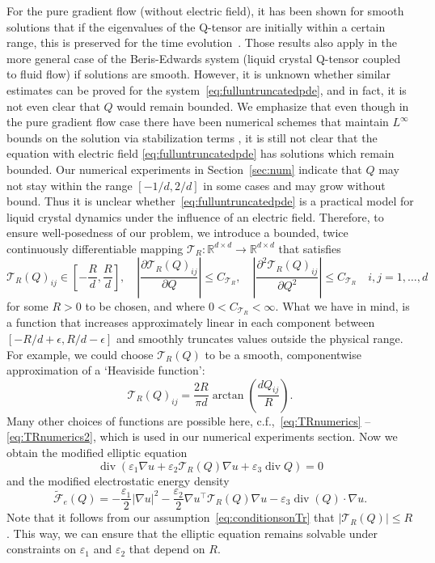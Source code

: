 \documentclass[10pt,letterpaper]{amsart}
\newcommand{\R}{\mathbb{R}}
\newcommand{\CTR}{C_{\mathcal{T}_R}}
\newcommand{\T}{\mathcal T}
\theoremstyle{definition}{\newtheorem{definition}[lemma]{Definition}}
\theoremstyle{note}{\newtheorem{claim}{Claim}[section]
\newtheorem*{claim*}{Claim}}
\numberwithin{equation}{section}
\begin{document}
For the pure gradient flow (without electric field), it has been shown for smooth solutions that if the eigenvalues of the Q-tensor are initially within a certain range, this is preserved for the time evolution~\cite{Wu2019,Contreras2019}. Those results also apply in the more general case of the Beris-Edwards system (liquid crystal Q-tensor coupled to fluid flow) if solutions are smooth. However, it is unknown whether similar estimates can be proved for the system~\eqref{eq:fulluntruncatedpde}, and in fact, it is not even clear that $Q$ would remain bounded. We emphasize that even though in the pure gradient flow case there have been numerical schemes that maintain $L^\infty$ bounds on the solution via stabilization terms \cite{boundpreserving2017,boundpreserving2025}, it is still not clear that the equation with electric field \eqref{eq:fulluntruncatedpde} has solutions which remain bounded. Our numerical experiments in Section~\ref{sec:num} indicate that $Q$ may not stay within the range $[-1/d,2/d]$ in some cases and may grow without bound.
Thus it is unclear whether~\eqref{eq:fulluntruncatedpde} is a practical model for liquid crystal dynamics under the influence of an electric field. Therefore, to ensure well-posedness of our problem, we introduce a bounded, twice continuously differentiable mapping $\T_R:\R^{d\times d}\to\R^{d\times d}$ that satisfies
\begin{equation}
	\label{eq:conditionsonTr}
	\mathcal{T}_R(Q)_{ij}\in \left[-\frac{R}{d},\frac{R}{d}\right],\quad \left|\frac{\partial\mathcal{T}_R(Q)_{ij}}{\partial Q}\right|\leq \CTR ,\quad \left|\frac{\partial^2\mathcal{T}_R(Q)_{ij}}{\partial Q^2}\right|\leq \CTR\quad i,j=1,\dots, d
\end{equation}
for some $R>0$ to be chosen, and where $0<\CTR<\infty$. What we have in mind, is a function that increases approximately linear in each component between $[-R/d+\epsilon,R/d-\epsilon]$ and smoothly truncates values outside the physical range. For example, we could choose $\mathcal{T}_R(Q)$ to be a smooth, componentwise approximation of a `Heaviside function':
\begin{equation*}
	\mathcal{T}_R(Q)_{ij}= \frac{2R}{\pi d}\arctan\left(\frac{d Q_{ij}}{R}\right).
\end{equation*}
Many other choices of functions are possible here, c.f.,~\eqref{eq:TRnumerics} -- \eqref{eq:TRnumerics2}, which is used in our numerical experiments section.
Now we obtain the modified elliptic equation
\begin{equation}
    \operatorname{div}(\varepsilon_1\nabla u + \varepsilon_2 \T_R(Q)\nabla u + \varepsilon_3\operatorname{div}Q) = 0
\end{equation}
and the modified electrostatic energy density
\begin{equation}
    \tilde{\mathcal{F}}_e(Q) = -\frac{\varepsilon_1}{2} \lvert \nabla u\rvert^2 -\frac{\varepsilon_2}{2} \nabla u^\top \T_R(Q)\nabla u - \varepsilon_3\operatorname{div}(Q)\cdot\nabla u.
\end{equation}
 Note that it follows from our assumption~\eqref{eq:conditionsonTr} that $|\T_R(Q)| \le R$. This way, we can ensure that the elliptic equation remains solvable under constraints on $\varepsilon_1$ and $\varepsilon_2$ that depend on $R$. 
\end{document}
